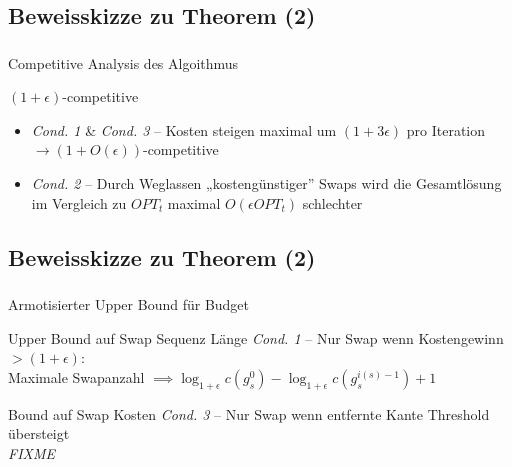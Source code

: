 \subsection{Beweisskizze zu Theorem (2)}
\begin{frame}
    \frametitle{\insertsubsection}
    Competitive Analysis des Algoithmus\\
    \vspace{1em}
    \begin{block}{$(1+\epsilon)$-competitive}
    \vspace{1em}
        \begin{itemize}
            \itemsep\setlength{1em}
            \item \emph{Cond. 1} \& \emph{Cond. 3} -- Kosten steigen maximal um $(1+3\epsilon)$ pro Iteration $\rightarrow (1+O(\epsilon))$-competitive
            \item \emph{Cond. 2} -- Durch Weglassen „kostengünstiger” Swaps wird die Gesamtlösung im Vergleich zu $OPT_t$ maximal $O(\epsilon OPT_t)$ schlechter
        \end{itemize}
    \vspace{1em}
    \end{block}
\end{frame}

\subsection{Beweisskizze zu Theorem (2)}
\begin{frame}
    \frametitle{\insertsubsection}
    Armotisierter Upper Bound für Budget
    \vspace{1em}
    \begin{block}{Upper Bound auf Swap Sequenz Länge}
        \vspace{1em}
        \emph{Cond. 1} -- Nur Swap wenn Kostengewinn $> (1+\epsilon)$:\\Maximale Swapanzahl $\implies \log_{1+\epsilon}c(g_s^0) - \log_{1+\epsilon}c(g_s^{i(s)-1}) + 1$
        \vspace{1em}
    \end{block}
    \vspace{1em}
    \begin{block}{Bound auf Swap Kosten}
        \vspace{1em}
        \emph{Cond. 3} -- Nur Swap wenn entfernte Kante Threshold übersteigt \\
        \emph{FIXME}
        \vspace{1em}
    \end{block}
\end{frame}

